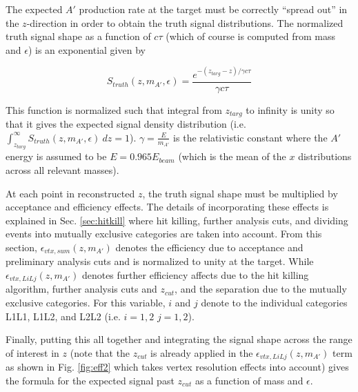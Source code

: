 The expected $A'$ production rate at the target must be correctly ``spread out'' in the $z$-direction in order to obtain the truth signal distributions. The normalized truth signal shape as a function of $c\tau$ (which of course is computed from mass and $\epsilon$) is an exponential given by

\begin{equation}
    S_{truth}(z,m_{A'},\epsilon)=\frac{e^{-(z_{targ}-z)/\gamma c\tau}}{\gamma c \tau}
    \label{eqn:ap_truth}
\end{equation}

This function is normalized such that integral from $z_{targ}$ to infinity is unity so that it gives the expected signal density distribution (i.e. $\int_{z_{targ}}^{\infty} S_{truth}(z,m_{A'},\epsilon) \ dz=1$). $\gamma=\frac{E}{m_{A'}}$ is the relativistic constant where the $A'$ energy is assumed to be $E=0.965 E_{beam}$ (which is the mean of the $x$ distributions across all relevant masses). %

At each point in reconstructed $z$, the truth signal shape must be multiplied by acceptance and efficiency effects. The details of incorporating these effects is explained in Sec. \ref{sec:hitkill} where hit killing, further analysis cuts, and dividing events into mutually exclusive categories are taken into account. From this section, $\epsilon_{vtx,sum}(z,m_{A'})$ denotes the efficiency due to acceptance and preliminary analysis cuts and is normalized to unity at the target. While $\epsilon_{vtx,LiLj}(z,m_{A'})$ denotes further efficiency affects due to the hit killing algorithm, further analysis cuts and $z_{cut}$, and the separation due to the mutually exclusive categories. For this variable, $i$ and $j$ denote to the individual categories L1L1, L1L2, and L2L2 (i.e. $i=1,2$ $j=1,2$).

Finally, putting this all together and integrating the signal shape across the range of interest in $z$ (note that the $z_{cut}$ is already applied in the $\epsilon_{vtx,LiLj}(z,m_{A'})$ term as shown in Fig. \ref{fig:eff2} which takes vertex resolution effects into account) gives the formula for the expected signal past $z_{cut}$ as a function of mass and $\epsilon$.

